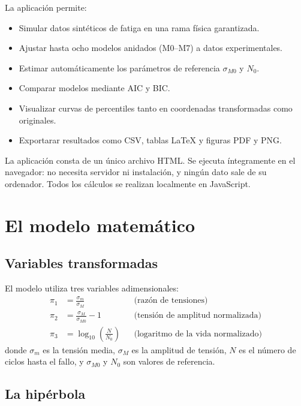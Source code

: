 \documentclass[11pt,a4paper]{article}
\newcommand{\piz}{\ensuremath{\pi_3}}
\newcommand{\pit}{\ensuremath{\pi_2}}
\newcommand{\pio}{\ensuremath{\pi_1}}
\newcommand{\sm}{\ensuremath{\sigma_m}}
\newcommand{\sM}{\ensuremath{\sigma_M}}
\newcommand{\sMzero}{\ensuremath{\sigma_{M0}}}
\newcommand{\Nzero}{\ensuremath{N_0}}
\begin{document}
La aplicación permite:
\begin{itemize}[leftmargin=1.4em]
  \item Simular datos sintéticos de fatiga en una rama física garantizada.
  \item Ajustar hasta ocho modelos anidados (M0--M7) a datos experimentales.
  \item Estimar automáticamente los parámetros de referencia $\sMzero$ y $\Nzero$.
  \item Comparar modelos mediante AIC y BIC.
  \item Visualizar curvas de percentiles tanto en coordenadas transformadas como originales.
  \item Exportarar resultados como CSV, tablas LaTeX y figuras PDF y PNG.
\end{itemize}

\begin{notebox}
La aplicación consta de un único archivo HTML. Se ejecuta íntegramente en el navegador: no necesita servidor ni instalación, y ningún dato sale de su ordenador. Todos los cálculos se realizan localmente en JavaScript.
\end{notebox}

\section{El modelo matemático}

\subsection{Variables transformadas}

El modelo utiliza tres variables adimensionales:
\begin{align}
  \pio &= \frac{\sm}{\sM} && \text{(razón de tensiones)} \\[2pt]
  \pit &= \frac{\sM}{\sMzero} - 1 && \text{(tensión de amplitud normalizada)} \\[2pt]
  \piz &= \log_{10}\!\left(\frac{N}{\Nzero}\right) && \text{(logaritmo de la vida normalizado)}
\end{align}
donde $\sm$ es la tensión media, $\sM$ es la amplitud de tensión, $N$ es el número de ciclos hasta el fallo, y $\sMzero$ y $\Nzero$ son valores de referencia.

\subsection{La hipérbola}
\end{document}

